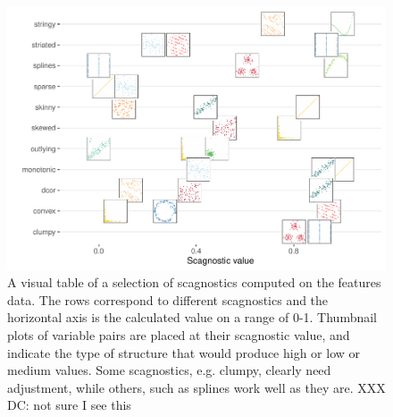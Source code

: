 \begin{Schunk}
\begin{figure}
\includegraphics[width=1\linewidth]{mason-lee-laa-cook_files/figure-latex/visual-table-1} \caption[A visual table of a selection of scagnostics computed on the features data]{A visual table of a selection of scagnostics computed on the features data. The rows correspond to different scagnostics and the horizontal axis is the calculated value on a range of 0-1. Thumbnail plots of variable pairs are placed at their scagnostic value, and indicate the type of structure that would produce high or low or medium values. Some scagnostics, e.g. clumpy, clearly need adjustment, while others, such as splines work well as they are. XXX DC: not sure I see this}\label{fig:visual-table}
\end{figure}
\end{Schunk}

